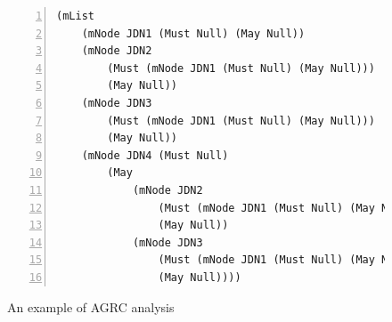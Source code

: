 \begin{figure}[t!]
	\newsavebox{\codeone}
	\begin{lrbox}{\codeone}
		\begin{minipage}[b]{0.62\textwidth}
		\begin{lstlisting}[tabsize=1,basicstyle=\small\ttfamily,numbers=left]
(mList 
	(mNode JDN1 (Must Null) (May Null))
	(mNode JDN2 
		(Must (mNode JDN1 (Must Null) (May Null))) 
		(May Null))
	(mNode JDN3 
		(Must (mNode JDN1 (Must Null) (May Null))) 
		(May Null))
	(mNode JDN4 (Must Null)
		(May 
			(mNode JDN2 
				(Must (mNode JDN1 (Must Null) (May Null))) 
				(May Null))
			(mNode JDN3 
				(Must (mNode JDN1 (Must Null) (May Null))) 
				(May Null))))
		\end{lstlisting}
	\end{minipage}
	\end{lrbox}

	\centering
	\hspace{1.0cm}
	\caption{An example of AGRC analysis}
	\label{fig:maymust}
\end{figure}


